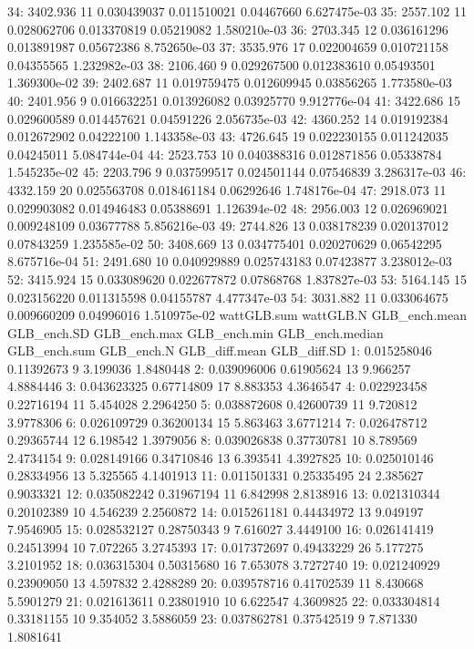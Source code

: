 \documentclass[
  10pt,
  a4paper,oneside]{article}
\begin{document}
34: 3402.936 11 0.030439037 0.011510021 0.04467660 6.627475e-03
35: 2557.102 11 0.028062706 0.013370819 0.05219082 1.580210e-03
36: 2703.345 12 0.036161296 0.013891987 0.05672386 8.752650e-03
37: 3535.976 17 0.022004659 0.010721158 0.04355565 1.232982e-03
38: 2106.460 9 0.029267500 0.012383610 0.05493501 1.369300e-02
39: 2402.687 11 0.019759475 0.012609945 0.03856265 1.773580e-03
40: 2401.956 9 0.016632251 0.013926082 0.03925770 9.912776e-04
41: 3422.686 15 0.029600589 0.014457621 0.04591226 2.056735e-03
42: 4360.252 14 0.019192384 0.012672902 0.04222100 1.143358e-03
43: 4726.645 19 0.022230155 0.011242035 0.04245011 5.084744e-04
44: 2523.753 10 0.040388316 0.012871856 0.05338784 1.545235e-02
45: 2203.796 9 0.037599517 0.024501144 0.07546839 3.286317e-03
46: 4332.159 20 0.025563708 0.018461184 0.06292646 1.748176e-04
47: 2918.073 11 0.029903082 0.014946483 0.05388691 1.126394e-02
48: 2956.003 12 0.026969021 0.009248109 0.03677788 5.856216e-03
49: 2744.826 13 0.038178239 0.020137012 0.07843259 1.235585e-02
50: 3408.669 13 0.034775401 0.020270629 0.06542295 8.675716e-04
51: 2491.680 10 0.040929889 0.025743183 0.07423877 3.238012e-03
52: 3415.924 15 0.033089620 0.022677872 0.07868768 1.837827e-03
53: 5164.145 15 0.023156220 0.011315598 0.04155787 4.477347e-03
54: 3031.882 11 0.033064675 0.009660209 0.04996016 1.510975e-02
wattGLB.sum wattGLB.N GLB\_ench.mean GLB\_ench.SD GLB\_ench.max GLB\_ench.min
GLB\_ench.median GLB\_ench.sum GLB\_ench.N GLB\_diff.mean GLB\_diff.SD
1: 0.015258046 0.11392673 9 3.199036 1.8480448
2: 0.039096006 0.61905624 13 9.966257 4.8884446
3: 0.043623325 0.67714809 17 8.883353 4.3646547
4: 0.022923458 0.22716194 11 5.454028 2.2964250
5: 0.038872608 0.42600739 11 9.720812 3.9778306
6: 0.026109729 0.36200134 15 5.863463 3.6771214
7: 0.026478712 0.29365744 12 6.198542 1.3979056
8: 0.039026838 0.37730781 10 8.789569 2.4734154
9: 0.028149166 0.34710846 13 6.393541 4.3927825
10: 0.025010146 0.28334956 13 5.325565 4.1401913
11: 0.011501331 0.25335495 24 2.385627 0.9033321
12: 0.035082242 0.31967194 11 6.842998 2.8138916
13: 0.021310344 0.20102389 10 4.546239 2.2560872
14: 0.015261181 0.44434972 13 9.049197 7.9546905
15: 0.028532127 0.28750343 9 7.616027 3.4449100
16: 0.026141419 0.24513994 10 7.072265 3.2745393
17: 0.017372697 0.49433229 26 5.177275 3.2101952
18: 0.036315304 0.50315680 16 7.653078 3.7272740
19: 0.021240929 0.23909050 13 4.597832 2.4288289
20: 0.039578716 0.41702539 11 8.430668 5.5901279
21: 0.021613611 0.23801910 10 6.622547 4.3609825
22: 0.033304814 0.33181155 10 9.354052 3.5886059
23: 0.037862781 0.37542519 9 7.871330 1.8081641
\end{document}
